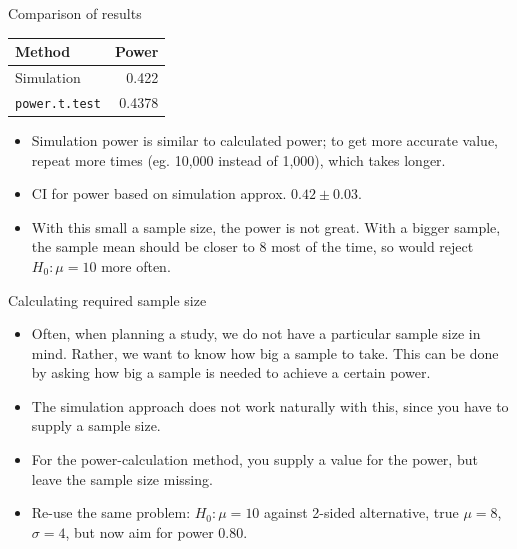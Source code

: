 \documentclass[ignorenonframetext,]{beamer}
\providecommand{\tightlist}{%
  \setlength{\itemsep}{0pt}\setlength{\parskip}{0pt}}
\begin{document}
\begin{frame}{Comparison of results}
\protect\hypertarget{comparison-of-results}{}

\begin{center}
  \begin{tabular}{lr}
    Method & Power\\
    \hline
    Simulation & 0.422\\
    \texttt{power.t.test} & 0.4378\\
    \hline
  \end{tabular}
    
  \end{center}

\begin{itemize}
\tightlist
\item
  Simulation power is similar to calculated power; to get more accurate
  value, repeat more times (eg. 10,000 instead of 1,000), which takes
  longer.
\item
  CI for power based on simulation approx. \(0.42 \pm 0.03\).
\item
  With this small a sample size, the power is not great. With a bigger
  sample, the sample mean should be closer to 8 most of the time, so
  would reject \(H_0 : \mu = 10\) more often.
\end{itemize}

\end{frame}

\begin{frame}{Calculating required sample size}
\protect\hypertarget{calculating-required-sample-size}{}

\begin{itemize}
\tightlist
\item
  Often, when planning a study, we do not have a particular sample size
  in mind. Rather, we want to know how big a sample to take. This can be
  done by asking how big a sample is needed to achieve a certain power.
\item
  The simulation approach does not work naturally with this, since you
  have to supply a sample size.
\item
  For the power-calculation method, you supply a value for the power,
  but leave the sample size missing.
\item
  Re-use the same problem: \(H_0 : \mu = 10\) against 2-sided
  alternative, true \(\mu = 8\), \(\sigma = 4\), but now aim for power
  0.80.
\end{itemize}

\end{frame}
\end{document}
